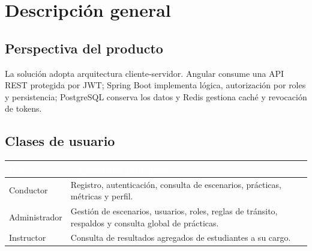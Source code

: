 \documentclass[11pt,a4paper]{article}
\begin{document}
\section{Descripción general}

\subsection{Perspectiva del producto}
La solución adopta arquitectura cliente-servidor. Angular consume una API REST protegida por JWT; Spring Boot implementa lógica, autorización por roles y persistencia; PostgreSQL conserva los datos y Redis gestiona caché y revocación de tokens.

\subsection{Clases de usuario}
\begin{table}[h]
    \centering
    \renewcommand{\arraystretch}{1.3}
    \begin{tabularx}{\textwidth}{@{}|l|X|@{}}
        \hline
        \rowcolor{uteqblue}
        \textcolor{white}{\textbf{Rol}} & \textcolor{white}{\textbf{Capacidades principales}} \\ \hline
        Conductor & Registro, autenticación, consulta de escenarios, prácticas, métricas y perfil. \\ \hline
        Administrador & Gestión de escenarios, usuarios, roles, reglas de tránsito, respaldos y consulta global de prácticas. \\ \hline
        Instructor & Consulta de resultados agregados de estudiantes a su cargo. \\ \hline
    \end{tabularx}
\end{table}
\end{document}

